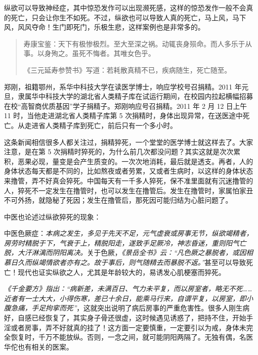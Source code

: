 纵欲可以导致神经症，其中惊恐发作可以出现濒死感，这样的惊恐发作一般不会真的死亡，只会让你生不如死。不过，纵欲也可以导致人真的死亡，马上风，马下风，风风夺命！生门即死门，乐极生悲，这样案例也是非常多的。

\begin{quotation}
    寿康宝鉴：天下有极惨极烈。至大至深之祸。动辄丧身殒命。而人多乐于从事。以身殉之。虽死不悔者。其唯女色乎。

    《三元延寿参赞书》写道：若耗散真精不已，疾病随生，死亡随至。
\end{quotation}

\begin{case}[猝死]
    郑刚，祖籍鄂州，系华中科技大学在读医学博士，响应学校号召捐精。2011 年元旦，隶属华中科技大学的湖北省人类精子库在试运行期间，在校园内拉起横幅招募在校“高智商优质基因”学子捐精子。郑刚响应号召捐精。2011 年 2 月 12 日上午 11 时，当他走进湖北省人类精子库第 5 次捐精时，身体出现异常，在送医途中死亡。从走进省人类精子库到死亡，前后只有一个多小时。
\end{case}

这条新闻相信很多人都关注过，捐精猝死，一个堂堂的医学博士就这样去了。大家注意，是在第 5 次捐精时猝死的，为什么前几次都没问题？其实这就是次次累积，恶果必现，量变是会产生质变的。一次次地消耗，最后就是透支。再者，人的身体状态每天都是不同的，比如熬夜或者劳累，又或者生病时，以这样的身体状态来撸管，弄不好真会猝死。中国每天有一千多人猝死，保不准里面就有沉迷撸管的人，猝死不一定发生在撸管时，也可以发生在撸管后。发生在撸管时，家属怕家丑不可外扬，就隐秘了死因；发生在撸管后，那死因可能归结为心脏问题了。

中医也论述过纵欲猝死的现象：

中医色厥症：{\it 本病之发生，多见于先天不足，元气虚衰或房事无节，纵欲竭精者，房劳时精脱于下，气衰于上，精脱阳走，遂致手足厥冷，神志昏迷，重则阳气亡脱，大汗淋漓而阴阳离决。}关于色厥，{\it 《景岳全书》云：“凡色厥之暴脱者，或因相慕日久而纵竭情欲者亦有之。故于事后，则气随精去而暴脱不返。”}甚至可以导致死亡！现代也证实纵欲之人，尤其是年龄较大的，易诱发心肌梗塞而猝死。

{\it 《千金要方》指出：“病新差，未满百日、气力未平复，而以房室者，略无不死……近者有一士大大，小得伤寒，差已十余日，能乘马行来，自谓平复，以房室，即小腹急痛，手足拘挛而死”}，这就突出说明了病后房事的严重危害性。很多人刚生病好，自感已经恢复了，其实身子骨还很虚，这时候遇见诱惑了，把持不住，开始手淫或者房事，弄不好就真的挂了！这方面一定要慎重，一定要引以为戒，身体未完全恢复时，千万不能放纵。否则，一念之间，就可能阴阳两隔了。无独有偶，名医华佗也有相关的医案。

